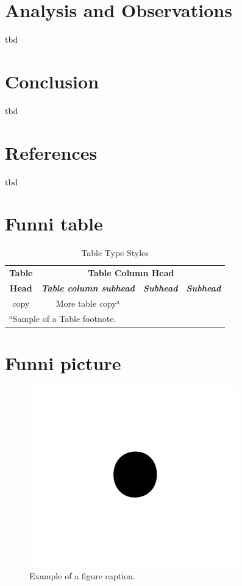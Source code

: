 \documentclass[conference]{IEEEtran}
\begin{document}
\section{Analysis and Observations}
tbd

\section{Conclusion}
tbd

\section{References}
tbd

\section{Funni table}

\begin{table}[htbp]
\caption{Table Type Styles}
\begin{center}
\begin{tabular}{|c|c|c|c|}
\hline
\textbf{Table}&\multicolumn{3}{|c|}{\textbf{Table Column Head}} \\
\cline{2-4} 
\textbf{Head} & \textbf{\textit{Table column subhead}}& \textbf{\textit{Subhead}}& \textbf{\textit{Subhead}} \\
\hline
copy& More table copy$^{\mathrm{a}}$& &  \\
\hline
\multicolumn{4}{l}{$^{\mathrm{a}}$Sample of a Table footnote.}
\end{tabular}
\label{tab1}
\end{center}
\end{table}

\section{Funni picture}

\begin{figure}[htbp]
\centerline{\includegraphics{fig1.png}}
\caption{Example of a figure caption.}
\label{fig}
\end{figure}
\end{document}
